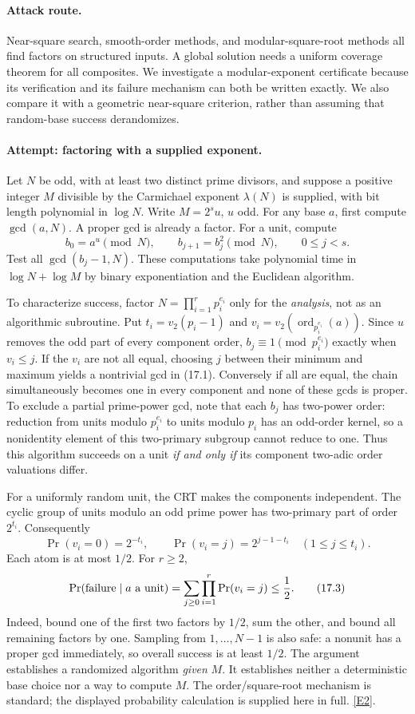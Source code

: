 \documentclass[11pt,a4paper]{article}
\newcommand{\eref}[2]{\hyperlink{extra:#1:#2}{[E#2]}}
\begin{document}
\paragraph{Attack route.}
Near-square search, smooth-order methods, and modular-square-root methods
all find factors on structured inputs. A global solution needs a uniform
coverage theorem for all composites. We investigate a modular-exponent
certificate because its verification and its failure mechanism can both
be written exactly. We also compare it with a geometric near-square
criterion, rather than assuming that random-base success derandomizes.

\paragraph{Attempt: factoring with a supplied exponent.}
Let $N$ be odd, with at least two distinct prime divisors, and suppose a
positive integer $M$ divisible by the Carmichael exponent $\lambda(N)$
is supplied, with bit length polynomial in $\log N$. Write $M=2^su$,
$u$ odd. For any base $a$, first compute $\gcd(a,N)$. A proper gcd is
already a factor. For a unit, compute
\[
 b_0=a^u\pmod N,\qquad b_{j+1}=b_j^2\pmod N,
 \qquad 0\leq j<s.
 \tag{17.1}
\]
Test all $\gcd(b_j-1,N)$. These computations take polynomial time in
$\log N+\log M$ by binary exponentiation and the Euclidean algorithm.

To characterize success, factor $N=\prod_{i=1}^r p_i^{e_i}$ only for the
\emph{analysis}, not as an algorithmic subroutine. Put
$t_i=v_2(p_i-1)$ and
$v_i=v_2(\operatorname{ord}_{p_i^{e_i}}(a))$. Since $u$ removes the odd
part of every component order, $b_j\equiv1\pmod{p_i^{e_i}}$ exactly when
$v_i\leq j$. If the $v_i$ are not all equal, choosing $j$ between their
minimum and maximum yields a nontrivial gcd in (17.1). Conversely if all
are equal, the chain simultaneously becomes one in every component and
none of these gcds is proper. To exclude a partial prime-power gcd,
note that each $b_j$ has two-power order: reduction from units modulo
$p_i^{e_i}$ to units modulo $p_i$ has an odd-order kernel, so a nonidentity
element of this two-primary subgroup cannot reduce to one. Thus this
algorithm succeeds on a unit
\emph{if and only if} its component two-adic order valuations differ.

For a uniformly random unit, the CRT makes the components independent.
The cyclic group of units modulo an odd prime power has two-primary
part of order $2^{t_i}$. Consequently
\[
 \Pr(v_i=0)=2^{-t_i},\qquad
 \Pr(v_i=j)=2^{j-1-t_i}\quad(1\leq j\leq t_i).
 \tag{17.2}
\]
Each atom is at most $1/2$. For $r\geq2$,
\[
 \Pr(\hbox{failure}\mid a\text{ a unit})
 =\sum_{j\geq0}\prod_{i=1}^r\Pr(v_i=j)\leq\frac12.
 \tag{17.3}
\]
Indeed, bound one of the first two factors by $1/2$, sum the other, and
bound all remaining factors by one. Sampling from $1,\ldots,N-1$ is also
safe: a nonunit has a proper gcd immediately, so overall success is at
least $1/2$. The argument establishes a randomized algorithm \emph{given}
$M$. It establishes neither a deterministic base choice nor a way to
compute $M$. The order/square-root mechanism is standard; the displayed
probability calculation is supplied here in full. \eref{8400004}{2}.
\end{document}

